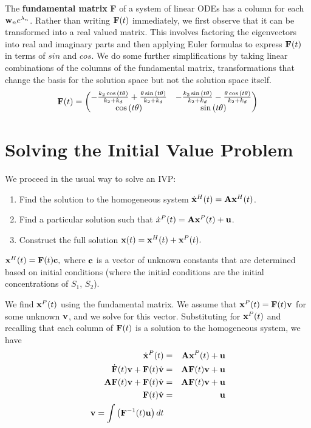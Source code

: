 \documentclass{bmcart}
\begin{document}
The {\bf fundamental matrix} {\bf F} of a system of 
linear ODEs has a column
for each
${\bf w}_n e^{\lambda_n}$.
Rather than writing ${\bf F} (t)$ immediately, we first
observe that it can be transformed into
a real valued matrix. This involves factoring the
eigenvectors into
real and imaginary parts and then applying Euler formulas
to express ${\bf F}(t)$
in terms of $sin$ and $cos$.
We do some further simplifications by taking linear
combinations of the columns of the fundamental matrix,
transformations that change the basis for the solution space
but not the solution space itself.
\begin{equation*}
{\bf F} (t) = \begin{pmatrix}- \frac{k_{2} \cos{\left(t \theta \right)}}{k_{2} + k_{d}} 
+ \frac{\theta \sin{\left(t \theta \right)}}{k_{2} + k_{d}} & - \frac{k_{2} \sin{\left(t \theta \right)}}{k_{2} + k_{d}} - \frac{\theta \cos{\left(t \theta \right)}}{k_{2} + k_{d}}\\\cos{\left(t \theta \right)} & \sin{\left(t \theta \right)}
\end{pmatrix}
\end{equation*}

\section{Solving the Initial Value Problem}
We proceed in the usual way to solve an IVP:
\begin{enumerate}
\item Find the
solution to the homogeneous system
$\dot{\bf x}^H (t) = {\bf A} {\bf x}^H (t)$.
\item
Find a particular solution such that
$\dot{x}^P (t) = {\bf A} {\bf x}^P (t) + {\bf u}$.
\item
Construct the full solution
${\bf x} (t) = {\bf x}^H (t) 
 + {\bf x}^P (t).$
\end{enumerate}

${\bf x}^H (t) = {\bf F} (t) {\bf c},$ where ${\bf c}$ is a vector
of unknown constants that are determined based on initial conditions (where the
initial conditions are the initial concentrations of
$S_1$, $S_2$).

We find ${\bf x}^P (t)$ using the fundamental matrix. We assume that ${\bf x}^P (t) = {\bf F}(t) {\bf v}$ for some unknown ${\bf v}$, and we solve for this vector. Substituting for ${\bf x}^P (t)$ and recalling that each column of ${\bf F}(t)$ is a solution to the homogeneous system, we have
\begin{eqnarray*}
\dot{\bf x}^P (t) &= & {\bf A} {\bf x}^P(t)  + {\bf u} \\
\dot{\bf F} (t) {\bf v} + {\bf F} (t) \dot{\bf v} & = & {\bf A} {\bf F}(t) {\bf v} + {\bf u} \\
{\bf A} {\bf F} (t){\bf v} + {\bf F} (t) \dot{\bf v} & = & {\bf A} {\bf F} (t) {\bf v} + {\bf u} \\
{\bf F} (t) \dot{\bf v} & = & {\bf u} \\
{\bf v} = \int \left( {\bf F}^{-1} (t) {\bf u} \right)dt
\end{eqnarray*}
\end{document}
